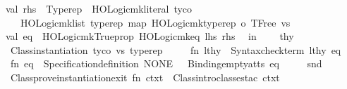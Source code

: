 \begin{isabellebody}
\ \ \ \ val\ rhs\ {\isacharequal}{\kern0pt}\ \isactrlConst {\isasymopen}Typerep{\isasymclose}\ {\isachardollar}{\kern0pt}\ HOLogic{\isachardot}{\kern0pt}mk{\isacharunderscore}{\kern0pt}literal\ tyco\isanewline
\ \ \ \ \ \ {\isachardollar}{\kern0pt}\ HOLogic{\isachardot}{\kern0pt}mk{\isacharunderscore}{\kern0pt}list\ \isactrlType {\isasymopen}typerep{\isasymclose}\ {\isacharparenleft}{\kern0pt}map\ {\isacharparenleft}{\kern0pt}HOLogic{\isachardot}{\kern0pt}mk{\isacharunderscore}{\kern0pt}typerep\ o\ TFree{\isacharparenright}{\kern0pt}\ vs{\isacharparenright}{\kern0pt}{\isacharsemicolon}{\kern0pt}\isanewline
\ \ \ \ val\ eq\ {\isacharequal}{\kern0pt}\ HOLogic{\isachardot}{\kern0pt}mk{\isacharunderscore}{\kern0pt}Trueprop\ {\isacharparenleft}{\kern0pt}HOLogic{\isachardot}{\kern0pt}mk{\isacharunderscore}{\kern0pt}eq\ {\isacharparenleft}{\kern0pt}lhs{\isacharcomma}{\kern0pt}\ rhs{\isacharparenright}{\kern0pt}{\isacharparenright}{\kern0pt}{\isacharsemicolon}{\kern0pt}\isanewline
\ \ in\isanewline
\ \ \ \ thy\isanewline
\ \ \ \ {\isacharbar}{\kern0pt}{\isachargreater}{\kern0pt}\ Class{\isachardot}{\kern0pt}instantiation\ {\isacharparenleft}{\kern0pt}{\isacharbrackleft}{\kern0pt}tyco{\isacharbrackright}{\kern0pt}{\isacharcomma}{\kern0pt}\ vs{\isacharcomma}{\kern0pt}\ \isactrlsort {\isasymopen}typerep{\isasymclose}{\isacharparenright}{\kern0pt}\isanewline
\ \ \ \ {\isacharbar}{\kern0pt}{\isachargreater}{\kern0pt}\ {\isacharbackquote}{\kern0pt}{\isacharparenleft}{\kern0pt}fn\ lthy\ {\isacharequal}{\kern0pt}{\isachargreater}{\kern0pt}\ Syntax{\isachardot}{\kern0pt}check{\isacharunderscore}{\kern0pt}term\ lthy\ eq{\isacharparenright}{\kern0pt}\isanewline
\ \ \ \ {\isacharbar}{\kern0pt}{\isacharminus}{\kern0pt}{\isachargreater}{\kern0pt}\ {\isacharparenleft}{\kern0pt}fn\ eq\ {\isacharequal}{\kern0pt}{\isachargreater}{\kern0pt}\ Specification{\isachardot}{\kern0pt}definition\ NONE\ {\isacharbrackleft}{\kern0pt}{\isacharbrackright}{\kern0pt}\ {\isacharbrackleft}{\kern0pt}{\isacharbrackright}{\kern0pt}\ {\isacharparenleft}{\kern0pt}Binding{\isachardot}{\kern0pt}empty{\isacharunderscore}{\kern0pt}atts{\isacharcomma}{\kern0pt}\ eq{\isacharparenright}{\kern0pt}{\isacharparenright}{\kern0pt}\isanewline
\ \ \ \ {\isacharbar}{\kern0pt}{\isachargreater}{\kern0pt}\ snd\isanewline
\ \ \ \ {\isacharbar}{\kern0pt}{\isachargreater}{\kern0pt}\ Class{\isachardot}{\kern0pt}prove{\isacharunderscore}{\kern0pt}instantiation{\isacharunderscore}{\kern0pt}exit\ {\isacharparenleft}{\kern0pt}fn\ ctxt\ {\isacharequal}{\kern0pt}{\isachargreater}{\kern0pt}\ Class{\isachardot}{\kern0pt}intro{\isacharunderscore}{\kern0pt}classes{\isacharunderscore}{\kern0pt}tac\ ctxt\ {\isacharbrackleft}{\kern0pt}{\isacharbrackright}{\kern0pt}{\isacharparenright}{\kern0pt}\isanewline

\end{isabellebody}
